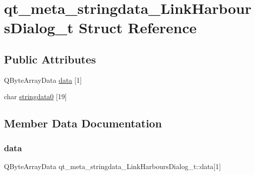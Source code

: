 \hypertarget{structqt__meta__stringdata___link_harbours_dialog__t}{}\section{qt\+\_\+meta\+\_\+stringdata\+\_\+\+Link\+Harbours\+Dialog\+\_\+t Struct Reference}
\label{structqt__meta__stringdata___link_harbours_dialog__t}
\subsection*{Public Attributes}
\begin{DoxyCompactItemize}
\item 
Q\+Byte\+Array\+Data \mbox{\hyperlink{structqt__meta__stringdata___link_harbours_dialog__t_a076dce4e10e34f1098850f502f461730}{data}} \mbox{[}1\mbox{]}
\item 
char \mbox{\hyperlink{structqt__meta__stringdata___link_harbours_dialog__t_a4f9e1267ff4231fa9f73de3488432d01}{stringdata0}} \mbox{[}19\mbox{]}
\end{DoxyCompactItemize}


\subsection{Member Data Documentation}
\mbox{\label{structqt__meta__stringdata___link_harbours_dialog__t_a076dce4e10e34f1098850f502f461730}} 
\subsubsection{\texorpdfstring{data}{data}}
{\footnotesize\ttfamily Q\+Byte\+Array\+Data qt\+\_\+meta\+\_\+stringdata\+\_\+\+Link\+Harbours\+Dialog\+\_\+t\+::data\mbox{[}1\mbox{]}}

\mbox{\label{structqt__meta__stringdata___link_harbours_dialog__t_a4f9e1267ff4231fa9f73de3488432d01}} 
